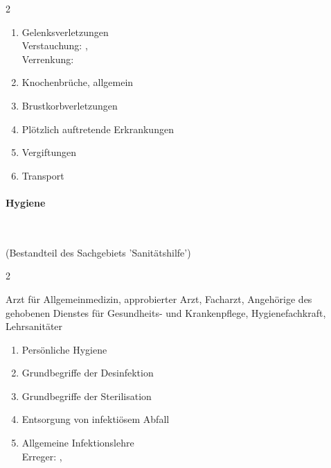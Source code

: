 \begin{WidePar}
\begin{multicols}{2}
\begin{enumerate}
    \item    Gelenksverletzungen
    \\
    Verstauchung:  \dotfill {},
    \\
    Verrenkung:  \dotfill {}
    \item
    Knochenbrüche, allgemein \dotfill  \noindent{}
    \item
    Brustkorbverletzungen
    \\
    \item    Plötzlich auftretende Erkrankungen \dotfill  {}
    \item    Vergiftungen \dotfill {}
    \item    Transport \dotfill {}
  \end{enumerate}

\paragraph{Hygiene}~
  
  (Bestandteil des Sachgebiets 'Sanitätshilfe')
  
  \begin{inparadesc}
    \item[Stundenanzahl:] 2
    \item[Lehrkraft:] Arzt für Allgemeinmedizin, approbierter Arzt,
    Facharzt, Angehörige des gehobenen Dienstes für Gesundheits- und Krankenpflege,
    Hygienefachkraft,  Lehrsanitäter
  \end{inparadesc}
  
  \begin{enumerate}
    \item    Persönliche Hygiene
    \\
    \item    Grundbegriffe der Desinfektion \dotfill  {}
    \item    Grundbegriffe der  Sterilisation \dotfill  {}
    \item    Entsorgung von infektiösem Abfall \dotfill {}
    \item    Allgemeine Infektionslehre
    \\
    Erreger:  \dotfill {},
    

\end{enumerate}
\end{multicols}
\end{WidePar}
